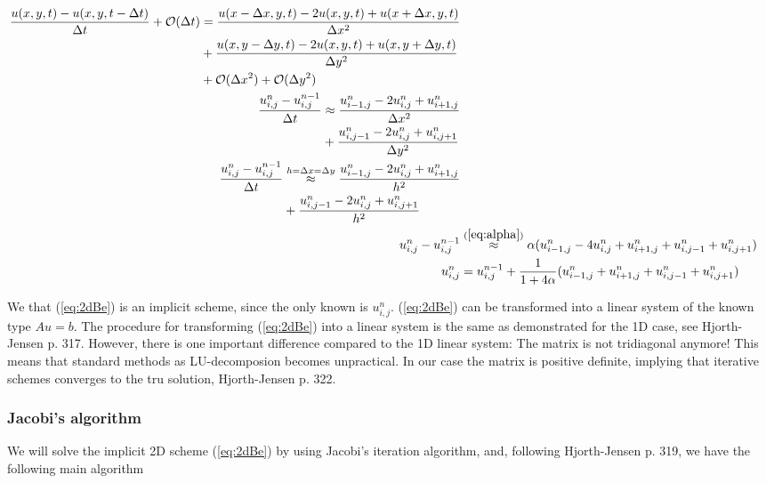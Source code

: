 \documentclass{article}
\begin{document}
\begin{subequations}
	\begin{align}
		\begin{split}
			\frac{u(x,y, t) - u(x,y,t - \Delta t)}{\Delta t} + \mathcal{O}(\Delta t) &= \frac{u(x - \Delta x,y, t) 
				- 2u(x,y,t) + u(x+ \Delta x,y, t)}{\Delta x^2} \\
			&+ \frac{u(x,y - \Delta y, t) - 2u(x,y,t) + u(x,y+ \Delta y, t)}{\Delta y^2}\\
			&+ \mathcal{O}(\Delta x^2) + \mathcal{O}(\Delta y^2)
		\end{split}\\
		\begin{split}
		\frac{u_{i,j}^n - u_{i,j}^{n-1}}{\Delta t}  &\approx \frac{u_{i-1,j}^{n} 
			- 2u_{i,j}^n + u_{i+1,j}^n}{\Delta x^2} \\
		&+ \frac{u_{i,j-1}^n - 2u_{i,j}^n + u_{i,j+1}^n}{\Delta y^2}
		\end{split}\\
		\begin{split}
			\frac{u_{i,j}^n - u_{i,j}^{n-1}}{\Delta t} &\stackrel{h = \Delta x = \Delta y}{\approx} \frac{u_{i-1,j}^{n} 
			- 2u_{i,j}^n + u_{i+1,j}^n}{h^2} \\
			&+ \frac{u_{i,j-1}^n - 2u_{i,j}^n + u_{i,j+1}^n}{h^2}
		\end{split}\\				
		u_{i,j}^n - u_{i,j}^{n-1}  &\stackrel{(\ref{eq:alpha})}{\approx} \alpha (u_{i-1,j}^{n} 
			- 4u_{i,j}^n + u_{i+1,j}^n + u_{i,j-1}^n + u_{i,j+1}^n)\\
		u_{i,j}^n &= u_{i,j}^{n-1}  + \frac{1}{1+4\alpha}(u_{i-1,j}^{n} 
		+ u_{i+1,j}^n + u_{i,j-1}^n + u_{i,j+1}^n)\label{eq:2dBe}
	\end{align}
\end{subequations}

We that (\ref{eq:2dBe}) is an implicit scheme, since the only known is $u_{i,j}^n$. (\ref{eq:2dBe}) can be transformed into a linear system of the known type $Au = b$. The procedure for transforming (\ref{eq:2dBe}) into a linear system is the same as demonstrated for the 1D case, see Hjorth-Jensen \cite{MHJ} p. 317. However, there is one important difference compared to the 1D linear system: The matrix is not tridiagonal anymore! This means that standard methods as LU-decomposion becomes unpractical. In our case the matrix is positive definite, implying that iterative schemes converges to the tru solution, Hjorth-Jensen \cite{MHJ} p. 322. 

\subsubsection{Jacobi's algorithm}
We will solve the implicit 2D scheme (\ref{eq:2dBe}) by using Jacobi's iteration algorithm, and, following Hjorth-Jensen \cite{MHJ} p. 319, we have the following main algorithm
\end{document}
